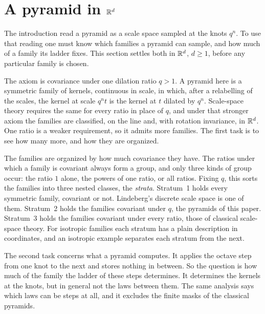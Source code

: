 \section{A pyramid in $\mathbb{R}^d$}
\label{ch:pyramid}

The introduction read a pyramid as a scale space sampled at the knots $q^n$. To use that reading
one must know which families a pyramid can sample, and how much of a family its ladder fixes. This
section settles both in $\mathbb{R}^d$, $d \ge 1$, before any particular family is chosen.

The axiom is covariance under one dilation ratio $q > 1$. A pyramid here is a symmetric family of
kernels, continuous in scale, in which, after a relabelling of the scales, the kernel at scale
$q^nt$ is the kernel at $t$ dilated by $q^n$. Scale-space theory requires the same for every ratio
in place of $q$, and under that stronger axiom the families are classified, on the line and, with
rotation invariance, in $\mathbb{R}^d$. One ratio is a weaker requirement, so it admits more families. The
first task is to see how many more, and how they are organized.

The families are organized by how much covariance they have. The ratios under which a family is covariant
always form a group, and only three kinds of group occur: the ratio $1$ alone, the powers of one
ratio, or all ratios. Fixing $q$, this sorts the families into three nested classes, the
\emph{strata}. Stratum~1 holds every symmetric family, covariant or not. Lindeberg's discrete scale space is
one of them. Stratum~2 holds the families covariant under $q$, the pyramids of this paper. Stratum~3
holds the families covariant under every ratio, those of classical scale-space theory. For
isotropic families each stratum has a plain description in \Levy{} coordinates, and an isotropic
example separates each stratum from the next.

The second task concerns what a pyramid computes. It applies the octave step from one knot to the
next and stores nothing in between. So the question is how much of the family the ladder of these
steps determines. It determines the kernels at the knots, but in general not the laws between
them. The same analysis says which laws can be steps at all, and it excludes the finite masks of
the classical pyramids.

